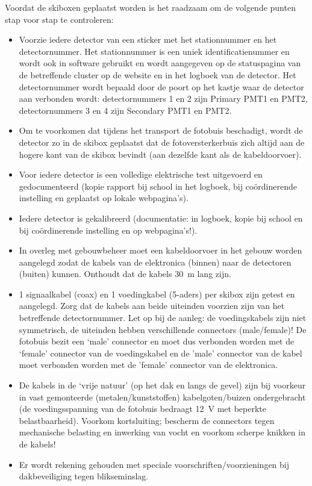Voordat de skiboxen geplaatst worden is het raadzaam om de volgende
punten stap voor stap te controleren:

\begin{itemize}
    \item Voorzie iedere detector van een sticker met het stationnummer
    en het detectornummer. Het stationnummer is een uniek
    identificatienummer en wordt ook in software gebruikt en wordt
    aangegeven op de statuspagina van de betreffende cluster op de
    \hisparc website en in het logboek van de detector. Het
    detectornummer wordt bepaald door de poort op het \hisparc kastje
    waar de detector aan verbonden wordt: detectornummers 1 en 2 zijn
    Primary PMT1 en PMT2, detectornummers 3 en 4 zijn Secondary PMT1 en PMT2.
    \item Om te voorkomen dat tijdens het transport de fotobuis
    beschadigt, wordt de detector zo in de skibox geplaatst dat de
    fotoversterkerbuis zich altijd aan de hogere kant van de skibox
    bevindt (aan dezelfde kant als de kabeldoorvoer).
    \item Voor iedere detector is een volledige elektrische test
    uitgevoerd en gedocumenteerd (kopie rapport bij school in het
    logboek, bij coördinerende instelling en geplaatst op lokale
    webpagina’s).
    \item Iedere detector is gekalibreerd (documentatie: in logboek,
    kopie bij school en bij coördinerende instelling en op
    webpagina’s!).
    \item In overleg met gebouwbeheer moet een kabeldoorvoer in het
    gebouw worden aangelegd zodat de kabels van de \hisparc elektronica
    (binnen) naar de detectoren (buiten) kunnen. Onthoudt dat de kabels
    \SI{30}{\meter} lang zijn.
    \item 1 signaalkabel (coax) en 1 voedingkabel (5-aders) per skibox
    zijn getest en aangelegd. Zorg dat de kabels aan beide uiteinden
    voorzien zijn van het betreffende detectornummer. Let op bij de
    aanleg: de voedingskabels zijn niet symmetrisch, de uiteinden hebben
    verschillende connectors (male/female)! De fotobuis bezit een ‘male’
    connector en moet dus verbonden worden met de ‘female’ connector van
    de voedingskabel en de 'male' connector van de kabel moet verbonden
    worden met de 'female' connector van de \hisparc elektronica.
    \item De kabels in de ‘vrije natuur’ (op het dak en langs de gevel)
    zijn bij voorkeur in vast gemonteerde (metalen/kunststoffen)
    kabelgoten/buizen ondergebracht (de voedingsspanning van de fotobuis
    bedraagt \SI{12}{\volt} met beperkte belastbaarheid). Voorkom
    kortsluiting; bescherm de connectors tegen mechanische belasting en
    inwerking van vocht en voorkom scherpe knikken in de kabels!
    \item Er wordt rekening gehouden met speciale
    voorschriften/voorzieningen bij dakbeveiliging tegen blikseminslag.
\end{itemize}


